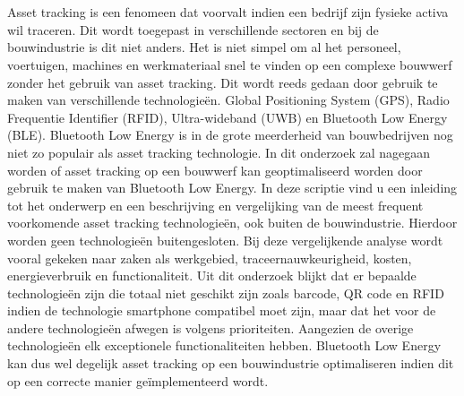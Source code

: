 \chapter*{}
Asset tracking is een fenomeen dat voorvalt indien een bedrijf zijn fysieke activa wil traceren. Dit wordt toegepast in verschillende sectoren en bij de bouwindustrie is dit niet anders. Het is niet simpel om al het personeel, voertuigen, machines en werkmateriaal snel te vinden op een complexe bouwwerf zonder het gebruik van asset tracking. Dit wordt reeds gedaan door gebruik te maken van verschillende technologieën. Global Positioning System (GPS), Radio Frequentie Identifier (RFID), Ultra-wideband (UWB) en Bluetooth Low Energy (BLE). Bluetooth Low Energy is in de grote meerderheid van bouwbedrijven nog niet zo populair als asset tracking technologie. In dit onderzoek zal nagegaan worden of asset tracking op een bouwwerf kan geoptimaliseerd worden door gebruik te maken van Bluetooth Low Energy. In deze scriptie vind u een inleiding tot het onderwerp en een beschrijving en vergelijking van de meest frequent voorkomende asset tracking technologieën, ook buiten de bouwindustrie. Hierdoor worden geen technologieën buitengesloten. Bij deze vergelijkende analyse wordt vooral gekeken naar zaken als werkgebied, traceernauwkeurigheid, kosten, energieverbruik en functionaliteit. Uit dit onderzoek blijkt dat er bepaalde technologieën zijn die totaal niet geschikt zijn zoals barcode, QR code en RFID indien de technologie smartphone compatibel moet zijn, maar dat het voor de andere technologieën afwegen is volgens prioriteiten. Aangezien de overige technologieën elk exceptionele functionaliteiten hebben. Bluetooth Low Energy kan dus wel degelijk asset tracking op een bouwindustrie optimaliseren indien dit op een correcte manier geïmplementeerd wordt.
